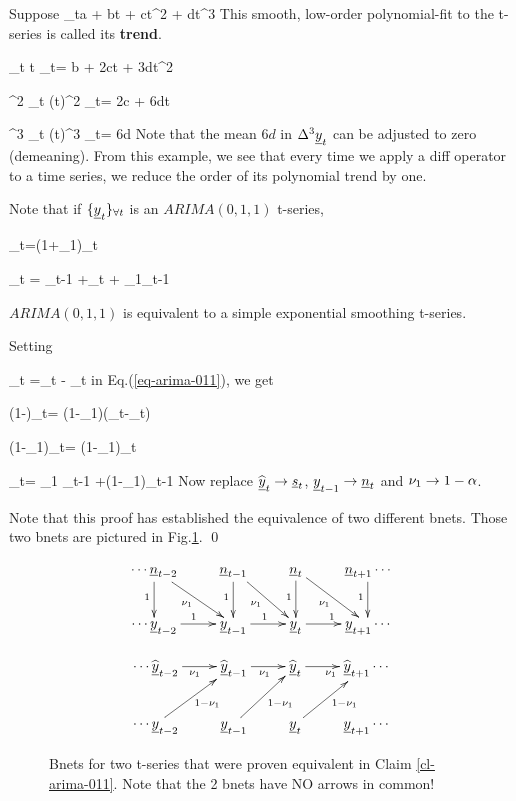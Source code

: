 Suppose
\beq
\rvy_t\approx a + bt + ct^2 + dt^3
\eeq
This smooth, low-order polynomial-fit
 to the t-series is called its {\bf trend}.

\beq
\Delta \rvy_t \approx
\Delta t \;\; \rvy_t=
b + 2ct + 3dt^2
\eeq

\beq
\Delta^2 \rvy_t \approx
(\Delta t)^2\;\; \rvy_t=
2c + 6dt
\eeq

\beq
\Delta^3 \rvy_t \approx
(\Delta t)^3\;\; \rvy_t=
6d
\eeq
Note that the mean $6d$
in $\Delta^3\rvy_t$
can be adjusted to zero
(demeaning).
From this example,
we  see that every time
we apply a diff operator
to a time series,
we reduce
the order
of its polynomial trend by one.

Note that if
$\tseries{\rvy_t}$
is an
$ARIMA(0,1,1)$ t-series,

\beq
\Delta\rvy_t=(1+\nu_1\calb)\rvn_t
\label{eq-arima-011}
\eeq

\beq
\rvy_t = \rvy_{t-1} +\rvn_t + \nu_1\rvn_{t-1}
\eeq

\begin{claim}\label{cl-arima-011}
$ARIMA(0,1,1)$ is equivalent to a
simple exponential smoothing t-series.
\end{claim}
\proof
Setting

\beq
\rvn_{t} =\rvy_{t}
 - \HAT{\rvy}_{t}
\eeq
in Eq.(\ref{eq-arima-011}), we get


\beq
(1-\calb)\rvy_t=
(1-\nu_1\calb)(\rvy_t-\HAT{\rvy}_t)
\eeq

\beq
(1-\nu_1\calb)\HAT{\rvy}_t=
(1-\nu_1)\calb\rvy_t
\eeq

\beq
\HAT{\rvy}_t=
\nu_1 \HAT{\rvy}_{t-1}
+(1-\nu_1)\rvy_{t-1}
\eeq
Now replace $\HAT{\rvy}_t\rarrow \rvs_t$,
$\rvy_{t-1}\rarrow \rvn_t$ and $\nu_1\rightarrow 1-\alpha$.

Note that this proof
has established
the equivalence of two different
bnets.
Those two bnets are
pictured in Fig.\ref{fig-arima-011}.
\qed


\begin{figure}[h!]
$$
\begin{array}{c}
\xymatrix{
\cdots
\rvn_{t-2}\ar[d]_1\ar[dr]_{\nu_1}
&\rvn_{t-1}\ar[d]_1\ar[dr]_{\nu_1}
&\rvn_t\ar[d]_1\ar[dr]_{\nu_1}
&\rvn_{t+1}\ar[d]_1
\cdots
\\
\cdots
\rvy_{t-2}\ar[r]^1
&\rvy_{t-1}\ar[r]^1
&\rvy_t\ar[r]^1
&\rvy_{t+1}
\cdots
}
\\
\\
\xymatrix{
\cdots
\HAT{\rvy}_{t-2}\ar[r]_{\nu_1}
&\HAT{\rvy}_{t-1}\ar[r]_{\nu_1}
&\HAT{\rvy}_t\ar[r]_{\nu_1}
&\HAT{\rvy}_{t+1}
\cdots
\\
\cdots
\rvy_{t-2}\ar[ur]_{1-\nu_1}
&\rvy_{t-1}\ar[ur]_{1-\nu_1}
&\rvy_t\ar[ur]_{1-\nu_1}
&\rvy_{t+1}
\cdots
}
\end{array}
$$
\caption{Bnets
for two t-series that were
proven equivalent
in Claim \ref{cl-arima-011}.
Note that the 2 bnets have NO
arrows in common!}
\label{fig-arima-011}
\end{figure}


